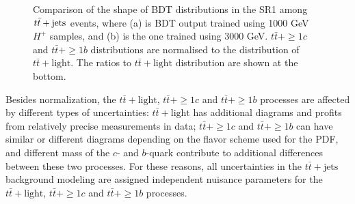 \begin{description}
    \begin{figure}[H]
      \centering
      \caption{Comparison of the shape of BDT distributions in the SR1 among $t\Bar{t}+\text{jets}$ events, where (a) is BDT output trained using 1000 GeV $H^{+}$ samples, and (b) is the one trained using 3000 GeV. $t\bar{t}+\geq1c$ and $t\bar{t}+\geq1b$ distributions are normalised to the distribution of $t\bar{t}+\text{light}$. The ratios to $t\bar{t}+\text{light}$ distribution are shown at the bottom.}
      \label{fig:CompTtbarShapeInSR1}
    \end{figure}

    Besides normalization, the $t\bar{t}+\text{light}$, $t\bar{t}+\geq1c$ and $t\bar{t}+\geq1b$ processes are affected by different types of uncertainties: $t\bar{t}+\text{light}$ has additional diagrams and profits from relatively precise measurements in data; $t\bar{t}+\geq1c$ and $t\bar{t}+\geq1b$ can have similar or different diagrams depending on the flavor scheme used for the PDF, and different mass of the $c$- and $b$-quark contribute to additional differences between these two processes. For these reasons, all uncertainties in the $t\bar{t}+\text{jets}$ background modeling are assigned independent nuisance parameters for the $t\bar{t}+\text{light}$, $t\bar{t}+\geq1c$ and $t\bar{t}+\geq1b$ processes.


\end{description}
